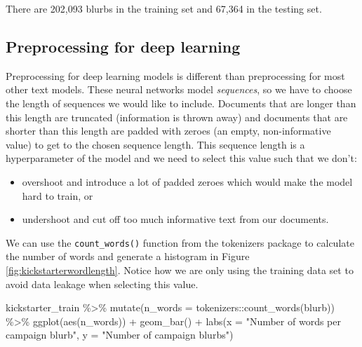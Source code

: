 \documentclass[
]{krantz}
\makeatletter
\newenvironment{Shaded}{\begin{snugshade}}{\end{snugshade}}
\newcommand{\AttributeTok}[1]{\textcolor[rgb]{0.77,0.63,0.00}{#1}}
\newcommand{\FunctionTok}[1]{\textcolor[rgb]{0.00,0.00,0.00}{#1}}
\newcommand{\NormalTok}[1]{#1}
\newcommand{\SpecialCharTok}[1]{\textcolor[rgb]{0.00,0.00,0.00}{#1}}
\newcommand{\StringTok}[1]{\textcolor[rgb]{0.31,0.60,0.02}{#1}}
\newenvironment{kframe}{%
\medskip{}
\setlength{\fboxsep}{.8em}
 \def\at@end@of@kframe{}%
 \ifinner\ifhmode%
  \def\at@end@of@kframe{\end{minipage}}%
  \begin{minipage}{\columnwidth}%
 \fi\fi%
 \def\FrameCommand##1{\hskip\@totalleftmargin \hskip-\fboxsep
 \colorbox{shadecolor}{##1}\hskip-\fboxsep
     \hskip-\linewidth \hskip-\@totalleftmargin \hskip\columnwidth}%
 \MakeFramed {\advance\hsize-\width
   \@totalleftmargin\z@ \linewidth\hsize
   \@setminipage}}%
 {\par\unskip\endMakeFramed%
 \at@end@of@kframe}
\renewenvironment{Shaded}{\begin{kframe}}{\end{kframe}}
\makeatother
\begin{document}
There are 202,093 blurbs in the training set and 67,364 in the testing set.

\hypertarget{dnnrecipe}{%
\subsection{Preprocessing for deep learning}\label{dnnrecipe}}

Preprocessing for deep learning models is different than preprocessing for most other text models. These neural networks model \emph{sequences}, so we have to choose the length of sequences we would like to include. Documents that are longer than this length are truncated (information is thrown away) and documents that are shorter than this length are padded with zeroes (an empty, non-informative value) to get to the chosen sequence length. This sequence length is a hyperparameter of the model and we need to select this value such that we don't:

\begin{itemize}
\item
  overshoot and introduce a lot of padded zeroes which would make the model hard to train, or
\item
  undershoot and cut off too much informative text from our documents.
\end{itemize}

We can use the \texttt{count\_words()} function from the tokenizers package to calculate the number of words and generate a histogram in Figure \ref{fig:kickstarterwordlength}. Notice how we are only using the training data set to avoid data leakage when selecting this value.

\begin{Shaded}
\begin{Highlighting}[]
\NormalTok{kickstarter\_train }\SpecialCharTok{\%\textgreater{}\%}
  \FunctionTok{mutate}\NormalTok{(}\AttributeTok{n\_words =}\NormalTok{ tokenizers}\SpecialCharTok{::}\FunctionTok{count\_words}\NormalTok{(blurb)) }\SpecialCharTok{\%\textgreater{}\%}
  \FunctionTok{ggplot}\NormalTok{(}\FunctionTok{aes}\NormalTok{(n\_words)) }\SpecialCharTok{+}
  \FunctionTok{geom\_bar}\NormalTok{() }\SpecialCharTok{+}
  \FunctionTok{labs}\NormalTok{(}\AttributeTok{x =} \StringTok{"Number of words per campaign blurb"}\NormalTok{,}
       \AttributeTok{y =} \StringTok{"Number of campaign blurbs"}\NormalTok{)}
\end{Highlighting}
\end{Shaded}
\end{document}
